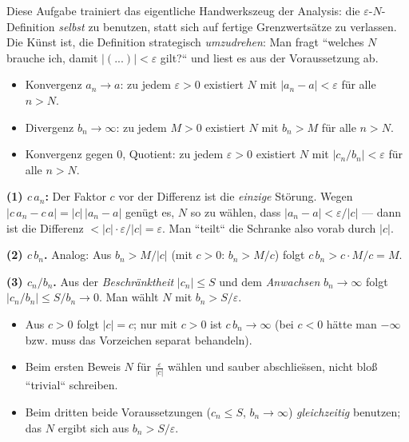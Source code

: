 


Diese Aufgabe trainiert das eigentliche Handwerkszeug der Analysis: die
$\varepsilon$-$N$-Definition \emph{selbst} zu benutzen, statt sich auf
fertige Grenzwerts\"atze zu verlassen. Die K\"unst ist, die Definition
strategisch \emph{umzudrehen}: Man fragt ``welches $N$ brauche ich, damit
$|(...)|<\varepsilon$ gilt?`` und liest es aus der Voraussetzung ab.

\begin{werkzeugkasten}
\begin{itemize}
  \item Konvergenz $a_n\to a$: zu jedem $\varepsilon>0$ existiert $N$ mit
        $|a_n-a|<\varepsilon$ f\"ur alle $n>N$.
  \item Divergenz $b_n\to\infty$: zu jedem $M>0$ existiert $N$ mit
        $b_n>M$ f\"ur alle $n>N$.
  \item Konvergenz gegen $0$, Quotient: zu jedem $\varepsilon>0$
        existiert $N$ mit $|c_n/b_n|<\varepsilon$ f\"ur alle $n>N$.
\end{itemize}
\end{werkzeugkasten}

\begin{werkzeugkasten}
\textbf{(1) $c\,a_n$:} Der Faktor $c$ vor der Differenz ist die
\emph{einzige} St\"orung. Wegen $|c\,a_n-c\,a|=|c|\,|a_n-a|$ gen\"ugt es,
$N$ so zu w\"ahlen, dass $|a_n-a|<\varepsilon/|c|$ --- dann ist die
Differenz $<|c|\cdot\varepsilon/|c|=\varepsilon$. Man ``teilt`` die
Schranke also vorab durch $|c|$.

\textbf{(2) $c\,b_n$.} Analog: Aus $b_n>M/|c|$ (mit $c>0$: $b_n>M/c$)
folgt $c\,b_n>c\cdot M/c=M$.

\textbf{(3) $c_n/b_n$.} Aus der \emph{Beschr\"anktheit} $|c_n|\le S$
und dem \emph{Anwachsen} $b_n\to\infty$ folgt
$|c_n/b_n|\le S/b_n\to0$. Man w\"ahlt $N$ mit $b_n>S/\varepsilon$.
\end{werkzeugkasten}

\begin{achtung}
\begin{itemize}
  \item Aus $c>0$ folgt $|c|=c$; nur mit $c>0$ ist $c\,b_n\to\infty$
        (bei $c<0$ h\"atte man $-\infty$ bzw. muss das Vorzeichen
        separat behandeln).
  \item Beim ersten Beweis $N$ f\"ur $\tfrac{\varepsilon}{|c|}$ w\"ahlen
        und sauber abschlie\"ssen, nicht blo\ss{} ``trivial`` schreiben.
  \item Beim dritten beide Voraussetzungen ($c_n\le S$, $b_n\to\infty$)
        \emph{gleichzeitig} benutzen; das $N$ ergibt sich aus
        $b_n>S/\varepsilon$.
\end{itemize}
\end{achtung}
